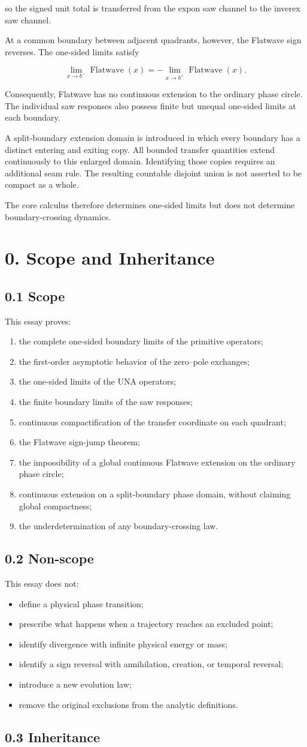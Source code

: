 \documentclass[11pt,oneside,openany]{book}
\newcommand{\PCsection}[1]{%
  \section*{#1}\addcontentsline{toc}{section}{#1}%
}
\newcommand{\PCsubsection}[1]{%
  \subsection*{#1}%
}
\begin{document}
so the signed unit total is transferred from the expon saw channel to the inverex saw channel.

At a common boundary between adjacent quadrants, however, the Flatwave sign reverses. The one-sided limits satisfy

\[
\lim_{x\to b^-}\operatorname{Flatwave}(x) = - \lim_{x\to b^+}\operatorname{Flatwave}(x).
\]


Consequently, Flatwave has no continuous extension to the ordinary phase circle. The individual saw responses also possess finite but unequal one-sided limits at each boundary.

A split-boundary extension domain is introduced in which every boundary has a distinct entering and exiting copy. All bounded transfer quantities extend continuously to this enlarged domain. Identifying those copies requires an additional seam rule. The resulting countable disjoint union is not asserted to be compact as a whole.

The core calculus therefore determines one-sided limits but does not determine boundary-crossing dynamics.


\PCsection{0. Scope and Inheritance}

\PCsubsection{0.1 Scope}

This essay proves:

\begin{enumerate}
\item the complete one-sided boundary limits of the primitive operators;
\item the first-order asymptotic behavior of the zero–pole exchanges;
\item the one-sided limits of the UNA operators;
\item the finite boundary limits of the saw responses;
\item continuous compactification of the transfer coordinate on each quadrant;
\item the Flatwave sign-jump theorem;
\item the impossibility of a global continuous Flatwave extension on the ordinary phase circle;
\item continuous extension on a split-boundary phase domain, without claiming global compactness;
\item the underdetermination of any boundary-crossing law.
\end{enumerate}
\PCsubsection{0.2 Non-scope}

This essay does not:

\begin{itemize}
\item define a physical phase transition;
\item prescribe what happens when a trajectory reaches an excluded point;
\item identify divergence with infinite physical energy or mass;
\item identify a sign reversal with annihilation, creation, or temporal reversal;
\item introduce a new evolution law;
\item remove the original exclusions from the analytic definitions.
\end{itemize}
\PCsubsection{0.3 Inheritance}
\end{document}
